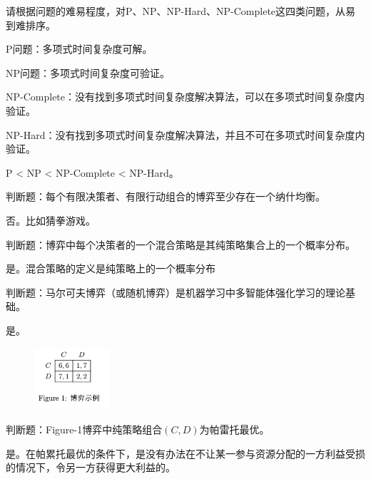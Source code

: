 \begin{problem}
	请根据问题的难易程度，对P、NP、NP-Hard、NP-Complete这四类问题，从易到难排序。
\end{problem}
\begin{solution}
	P问题：多项式时间复杂度可解。

	NP问题：多项式时间复杂度可验证。

	NP-Complete：没有找到多项式时间复杂度解决算法，可以在多项式时间复杂度内验证。
	
	NP-Hard：没有找到多项式时间复杂度解决算法，并且不可在多项式时间复杂度内验证。

	P < NP < NP-Complete < NP-Hard。
\end{solution}



\begin{problem}
	判断题：每个有限决策者、有限行动组合的博弈至少存在一个纳什均衡。
\end{problem}
\begin{solution}
	否。比如猜拳游戏。
\end{solution}



\begin{problem}
	判断题：博弈中每个决策者的一个混合策略是其纯策略集合上的一个概率分布。
\end{problem}
\begin{solution}
	是。混合策略的定义是纯策略上的一个概率分布
\end{solution}



\begin{problem}
	判断题：马尔可夫博弈（或随机博弈）是机器学习中多智能体强化学习的理论基础。
\end{problem}
\begin{solution}
	是。
\end{solution}

\begin{figure}[htbp]
	\centering\label{fig:1}
	\includegraphics[width=0.25\textwidth]{./figure/fig1.png}
\end{figure}



\begin{problem}
	判断题：Figure-1博弈中纯策略组合$(C,D)$为帕雷托最优。
\end{problem}
\begin{solution}
	是。在帕累托最优的条件下，是没有办法在不让某一参与资源分配的一方利益受损的情况下，令另一方获得更大利益的。
	
\end{solution}



